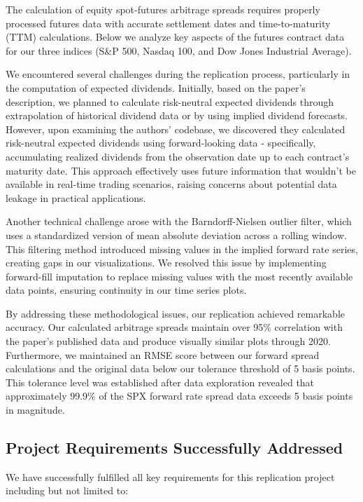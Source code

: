 \documentclass{article}
\begin{document}
The calculation of equity spot-futures arbitrage spreads requires properly processed futures data with accurate settlement dates and time-to-maturity (TTM) calculations. Below we analyze key aspects of the futures contract data for our three indices (S\&P 500, Nasdaq 100, and Dow Jones Industrial Average).

We encountered several challenges during the replication process, particularly in the computation of expected dividends. Initially, based on the paper's description, we planned to calculate risk-neutral expected dividends through extrapolation of historical dividend data or by using implied dividend forecasts. However, upon examining the authors' codebase, we discovered they calculated risk-neutral expected dividends using forward-looking data - specifically, accumulating realized dividends from the observation date up to each contract's maturity date. This approach effectively uses future information that wouldn't be available in real-time trading scenarios, raising concerns about potential data leakage in practical applications.

Another technical challenge arose with the Barndorff-Nielsen outlier filter, which uses a standardized version of mean absolute deviation across a rolling window. This filtering method introduced missing values in the implied forward rate series, creating gaps in our visualizations. We resolved this issue by implementing forward-fill imputation to replace missing values with the most recently available data points, ensuring continuity in our time series plots.

By addressing these methodological issues, our replication achieved remarkable accuracy. Our calculated arbitrage spreads maintain over 95\% correlation with the paper's published data and produce visually similar plots through 2020. Furthermore, we maintained an RMSE score between our forward spread calculations and the original data below our tolerance threshold of 5 basis points. This tolerance level was established after data exploration revealed that approximately 99.9\% of the SPX forward rate spread data exceeds 5 basis points in magnitude.

\subsection{Project Requirements Successfully Addressed}

We have successfully fulfilled all key requirements for this replication project including but not limited to:
\end{document}
